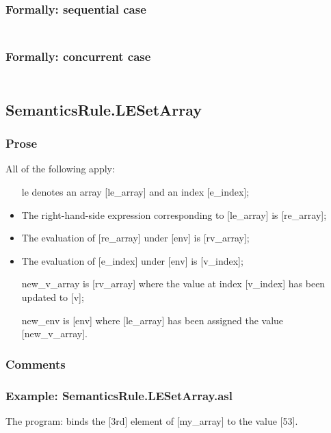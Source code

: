 \documentclass{book}
\begin{document}
  \subsubsection{Formally: sequential case}
  \begin{align}
  \end{align} 

  \subsubsection{Formally: concurrent case}
  \begin{align}
  \end{align} 

\subsection{SemanticsRule.LESetArray \label{sec:SemanticsRule.LESetArray}}

    \subsubsection{Prose}
    All of the following apply:
    \begin{itemize}
    \item [le] denotes an array [le\_array] and an index [e\_index];
    \item The right-hand-side expression corresponding to [le\_array] is [re\_array];
    \item The evaluation of [re\_array] under [env] is [rv\_array];
    \item The evaluation of [e\_index] under [env] is [v\_index];
    \item [new\_v\_array] is [rv\_array] where the value at index [v\_index] has been
      updated to [v];
    \item [new\_env] is [env] where [le\_array] has been assigned the value
      [new\_v\_array].
    \end{itemize}

    \subsubsection{Comments}

    \subsubsection{Example: SemanticsRule.LESetArray.asl}
    The program:
    binds the [3rd] element of [my\_array] to the value [53].
\end{document}
